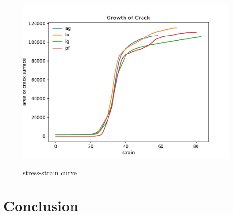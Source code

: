\documentclass[final,5p,times,onecolumn]{elsarticle}
\begin{document}
\begin{figure}
	\centering
	\includegraphics[width=1\linewidth]{img/crack_surf}
	\label{fig:surf}
	\caption{stress-strain curve}
\end{figure}

\section{Conclusion}
%


\end{document}
